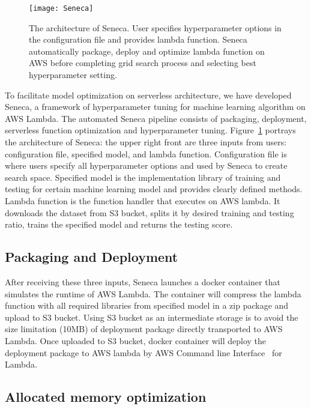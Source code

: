 \begin{figure}[t] \centering 
\texttt{[image: Seneca]}
\caption{The architecture of Seneca. 
User specifies hyperparameter options in the configuration file and provides lambda function. Seneca automatically package, deploy and optimize lambda function on AWS before completing grid search process and selecting best hyperparameter setting.
\label{fig:seneca}}
\end{figure}

To facilitate model optimization on serverless architecture, we have developed Seneca, a framework of  hyperparameter tuning for machine learning algorithm on AWS Lambda. The automated Seneca pipeline consists of packaging, deployment, serverless function optimization and hyperparameter tuning. Figure~\ref{fig:seneca} portrays the architecture of Seneca: the upper right front are three inputs from users: configuration file, specified model, and lambda function. Configuration file is where users specify all hyperparameter options and used by Seneca to create search space. Specified model is the implementation library of training and testing for certain machine learning model and provides clearly defined methods. Lambda function is the function handler that executes on AWS lambda. It downloads the dataset from S3 bucket, splits it by desired training and testing ratio, trains the specified model and returns the testing score. 

\subsection{Packaging and Deployment}

After receiving these three inputs, Seneca launches a docker container that simulates the runtime of AWS Lambda. The container will compress the lambda function with all required libraries from specified model in a zip package and upload to S3 bucket. Using S3 bucket as an intermediate storage is to avoid the size limitation (10MB) of deployment package directly transported to AWS Lambda. Once uploaded to S3 bucket, docker container will deploy the deployment package to AWS lambda by AWS Command line Interface~\cite{ref:awscli} for Lambda. 


\subsection{Allocated memory optimization}

